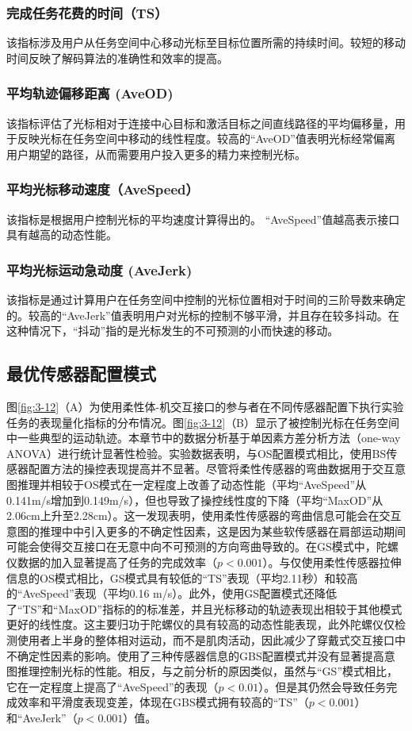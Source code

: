  \subsubsection{完成任务花费的时间（TS）}该指标涉及用户从任务空间中心移动光标至目标位置所需的持续时间。较短的移动时间反映了解码算法的准确性和效率的提高。
 \subsubsection{平均轨迹偏移距离 (AveOD)}该指标评估了光标相对于连接中心目标和激活目标之间直线路径的平均偏移量，用于反映光标在任务空间中移动的线性程度。较高的``AveOD''值表明光标经常偏离用户期望的路径，从而需要用户投入更多的精力来控制光标。
 \subsubsection{平均光标移动速度（AveSpeed）}该指标是根据用户控制光标的平均速度计算得出的。 “AveSpeed”值越高表示接口具有越高的动态性能。
 \subsubsection{平均光标运动急动度 (AveJerk) }该指标是通过计算用户在任务空间中控制的光标位置相对于时间的三阶导数来确定的。较高的``AveJerk''值表明用户对光标的控制不够平滑，并且存在较多抖动。在这种情况下，``抖动''指的是光标发生的不可预测的小而快速的移动。  

\subsection{最优传感器配置模式}图\ref{fig:3-12}（A）为使用柔性体-机交互接口的参与者在不同传感器配置下执行实验任务的表现量化指标的分布情况。图\ref{fig:3-12}（B）显示了被控制光标在任务空间中一些典型的运动轨迹。本章节中的数据分析基于单因素方差分析方法（one-way ANOVA）进行统计显著性检验。实验数据表明，与OS配置模式相比，使用BS传感器配置方法的操控表现提高并不显著。尽管将柔性传感器的弯曲数据用于交互意图推理并相较于OS模式在一定程度上改善了动态性能（平均``AveSpeed''从0.141m/s增加到0.149m/s），但也导致了操控线性度的下降（平均``MaxOD''从2.06cm上升至2.28cm）。这一发现表明，使用柔性传感器的弯曲信息可能会在交互意图的推理中中引入更多的不确定性因素，这是因为某些软传感器在肩部运动期间可能会使得交互接口在无意中向不可预测的方向弯曲导致的。在GS模式中，陀螺仪数据的加入显著提高了任务的完成效率（$p<0.001$）。与仅使用柔性传感器拉伸信息的OS模式相比，GS模式具有较低的``TS''表现（平均2.11秒）和较高的``AveSpeed''表现（平均0.16 m/s）。此外，使用GS配置模式还降低了``TS''和``MaxOD''指标的的标准差，并且光标移动的轨迹表现出相较于其他模式更好的线性度。这主要归功于陀螺仪的具有较高的动态性能表现，此外陀螺仪仅检测使用者上半身的整体相对运动，而不是肌肉活动，因此减少了穿戴式交互接口中不确定性因素的影响。使用了三种传感器信息的GBS配置模式并没有显著提高意图推理控制光标的性能。相反，与之前分析的原因类似，虽然与``GS''模式相比，它在一定程度上提高了``AveSpeed''的表现（$p<0.01$）。但是其仍然会导致任务完成效率和平滑度表现变差，体现在GBS模式拥有较高的``TS''（$p<0.001$）和``AveJerk''（$p<0.001$）值。

